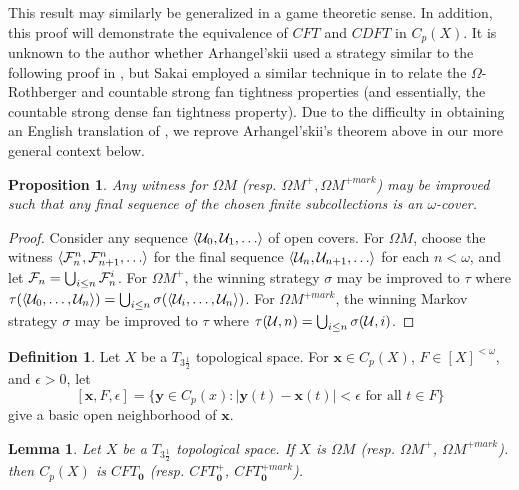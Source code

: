 \documentclass{amsart}
\renewcommand{\vec}{\mathbf}
\theoremstyle{plain}
\newtheorem{lemma}[theorem]{Lemma}
\newtheorem{proposition}[theorem]{Proposition}
\theoremstyle{definition}
\newtheorem{definition}[theorem]{Definition}
\theoremstyle{remark}
\theoremstyle{plain}
\theoremstyle{definition}
\theoremstyle{remark}
\begin{document}
This result may similarly be generalized in a game theoretic sense.
In addition, this proof will demonstrate the equivalence of
\(CFT\) and \(CDFT\) in \(C_p(X)\).
It is unknown to the author whether Arhangel'skii
used a strategy similar to the following proof in \cite{MR837289},
but Sakai employed a similar technique
in \cite{MR964873} to relate the \(\Omega\)-Rothberger and
countable strong fan tightness properties
(and essentially, the countable strong dense fan tightness property).
Due to the difficulty in obtaining an English translation of
\cite{MR837289}, we reprove Arhangel'skii's theorem above in our
more general context below.

\begin{proposition}
  Any witness for \(\Omega M\) (resp. \(\Omega M^+,\Omega M^{+mark}\))
  may be improved such that any final sequence of the chosen
  finite subcollections is an \(\omega\)-cover.
\end{proposition}

\begin{proof}
  Consider any sequence \(\<\mc U_0,\mc U_1,\dots\>\) of open covers.
  For \(\Omega M\), choose the witness
  \(\<\mc F_n^n,\mc F_{n+1}^n,\dots\>\) for the final
  sequence \(\<\mc U_n,\mc U_{n+1},\dots\>\) for each \(n<\omega\),
  and let \(\mathcal{F}_n=\bigcup_{i\leq n}\mathcal{F}_n^i\).
  For \(\Omega M^+\), the winning strategy \(\sigma\) may be improved to
  \(\tau\) where
  \(
    \tau(\langle\mathcal{U}_0,\dots,\mathcal{U}_n\rangle)
      =
    \bigcup_{i\leq n}\sigma(\langle\mathcal{U}_i,\dots,\mathcal{U}_n\rangle)
  \). For \(\Omega M^{+mark}\), the winning Markov strategy \(\sigma\) may
  be improved to \(\tau\) where
  \(
    \tau(\mathcal{U},n)
      =
    \bigcup_{i\leq n}\sigma(\mathcal{U},i)
  \).
\end{proof}

\begin{definition}
  Let \(X\) be a \(T_{3\frac{1}{2}}\) topological space.
  For \(\vec x\in C_p(X)\), \(F\in[X]^{<\omega}\), and
  \(\epsilon>0\), let
  \[
    [\vec x,F,\epsilon]
      =
    \{
      \vec y\in C_p(x)
    :
      |\vec y(t)-\vec x(t)|<\epsilon
    \text{ for all }
      t\in F
    \}
  \]
  give a basic open neighborhood of \(\vec x\).
\end{definition}

\begin{lemma}
  Let \(X\) be a \(T_{3\frac{1}{2}}\) topological space.
  If \(X\) is \(\Omega M\)
  (resp. \(\Omega M^+\), \(\Omega M^{+mark}\)).
  then \(C_p(X)\) is \(CFT_{\vec 0}\)
  (resp. \(CFT_{\vec 0}^+\), \(CFT_{\vec 0}^{+mark}\)).
\end{lemma}
\end{document}
